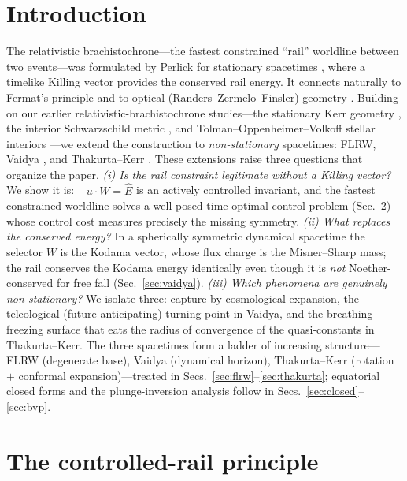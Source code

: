 \documentclass[12pt]{iopart}
\newcommand{\Ehat}{\hat E}
\begin{document}
\section{Introduction}
\label{sec:intro}
The relativistic brachistochrone---the fastest constrained ``rail'' worldline
between two events---was formulated by Perlick for stationary spacetimes
\cite{Perlick1991,PerlickRayOptics}, where a timelike Killing vector provides
the conserved rail energy. It connects naturally to Fermat's principle and to
optical (Randers--Zermelo--Finsler) geometry
\cite{Kovner1990,Randers1941,GibbonsWerner2008,GibbonsRanders2009,BaoRoblesShen}.
Building on our earlier relativistic-brachistochrone studies---the stationary
Kerr geometry \cite{RosignoliKerr}, the interior Schwarzschild metric
\cite{RosignoliIntSchw}, and Tolman--Oppenheimer--Volkoff stellar interiors
\cite{RosignoliTOV}---we extend the construction to \emph{non-stationary}
spacetimes: FLRW, Vaidya \cite{Vaidya1951}, and Thakurta--Kerr
\cite{Thakurta1981}.
These extensions raise three questions that organize the paper.
\emph{(i) Is the rail constraint legitimate without a Killing vector?} We show it
is: $-u\cdot W=\Ehat$ is an actively controlled invariant, and the fastest
constrained worldline solves a well-posed time-optimal control problem
(Sec.~\ref{sec:principle}) whose control cost measures precisely the missing
symmetry. \emph{(ii) What replaces the conserved energy?} In a spherically
symmetric dynamical spacetime the selector $W$ is the Kodama vector, whose flux
charge is the Misner--Sharp mass; the rail conserves the Kodama energy
identically even though it is \emph{not} Noether-conserved for free fall
(Sec.~\ref{sec:vaidya}). \emph{(iii) Which phenomena are genuinely
non-stationary?} We isolate three: capture by cosmological expansion, the
teleological (future-anticipating) turning point in Vaidya, and the breathing
freezing surface that eats the radius of convergence of the quasi-constants in
Thakurta--Kerr. The three spacetimes form a ladder of increasing structure---%
FLRW (degenerate base), Vaidya (dynamical horizon), Thakurta--Kerr
(rotation $+$ conformal expansion)---treated in
Secs.~\ref{sec:flrw}--\ref{sec:thakurta}; equatorial closed forms and the
plunge-inversion analysis follow in Secs.~\ref{sec:closed}--\ref{sec:bvp}.


\section{The controlled-rail principle}
\label{sec:principle}
\end{document}
